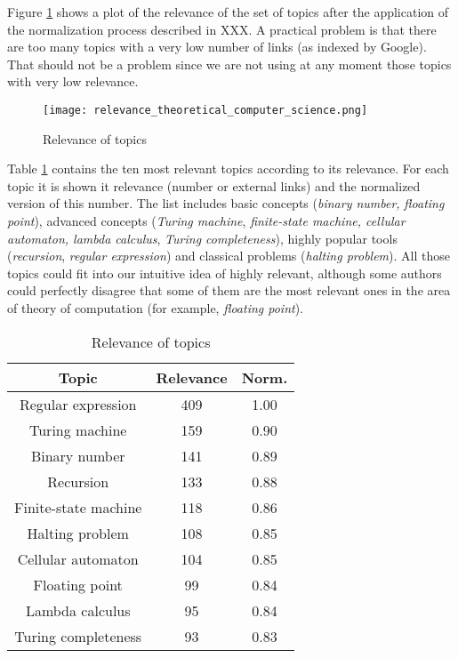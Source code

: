 Figure \ref{fig:Relevance-of-Topics} shows a plot of the relevance of the set of topics after the application of the normalization process described in {\color{red} XXX}. A practical problem is that there are too many topics with a very low number of links (as indexed by Google). That should not be a problem since we are not using at any moment those topics with very low relevance.

\begin{figure}[h]
\centering\texttt{[image: relevance\_theoretical\_computer\_science.png]}
\caption{\label{fig:Relevance-of-Topics}Relevance of topics}
\end{figure}

Table \ref{tab:Relevance-of-Topics} contains the ten most relevant topics according to its relevance. For each topic it is shown it relevance (number or external links) and the normalized version of this number. The list includes basic concepts (\emph{binary number,} \emph{floating point}), advanced concepts (\emph{Turing machine}, \emph{finite-state machine, cellular automaton, lambda calculus}, \emph{Turing completeness}), highly popular tools (\emph{recursion}, \emph{regular expression}) and classical problems (\emph{halting problem}). All those topics could fit into our intuitive idea of highly relevant, although some authors could perfectly disagree that some of them are the most relevant ones in the area of theory of computation (for example, \emph{floating point}).

\begin{table}
\begin{centering}
\begin{tabular}{|c|c|c|}
\hline 
Topic & Relevance & Norm.\tabularnewline
\hline 
\hline 
Regular expression & 409 & 1.00\tabularnewline
\hline 
Turing machine & 159 & 0.90\tabularnewline
\hline 
Binary number & 141 & 0.89\tabularnewline
\hline 
Recursion & 133 & 0.88\tabularnewline
\hline 
Finite-state machine & 118 & 0.86\tabularnewline
\hline 
Halting problem & 108 & 0.85\tabularnewline
\hline 
Cellular automaton & 104 & 0.85\tabularnewline
\hline 
Floating point & 99 & 0.84\tabularnewline
\hline 
Lambda calculus & 95 & 0.84\tabularnewline
\hline 
Turing completeness & 93 & 0.83\tabularnewline
\hline 
\end{tabular}
\par\end{centering}

\caption{\label{tab:Relevance-of-Topics}Relevance of topics}
\end{table}

